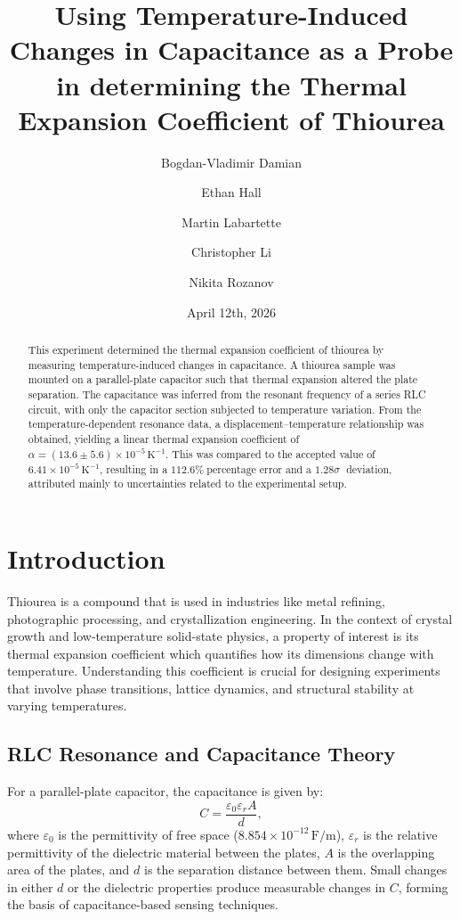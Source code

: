 \documentclass[letterpaper,12pt]{article}
\title{Using Temperature-Induced Changes in Capacitance as a Probe in determining the Thermal Expansion Coefficient of Thiourea }
\author[1]{Bogdan-Vladimir Damian}
\author[1]{Ethan Hall}
\author[1]{Martin Labartette}
\author[1]{Christopher Li}
\author[1]{Nikita Rozanov}
\affil[1]{McGill University, Department of Physics, 3600 University Street, H3A 2T8 Montréal Québec, Canada}
\date{April 12th, 2026}                     %
\begin{document}
\maketitle %


\begin{abstract}

\noindent
This experiment determined the thermal expansion coefficient of thiourea by measuring temperature-induced changes in capacitance. A thiourea sample was mounted on a parallel-plate capacitor such that thermal expansion altered the plate separation. The capacitance was inferred from the resonant frequency of a series RLC circuit, with only the capacitor section subjected to temperature variation. From the temperature-dependent resonance data, a displacement–temperature relationship was obtained, yielding a linear thermal expansion coefficient of \(\alpha = (13.6 \pm 5.6) \times 10^{-5}\,\mathrm{K^{-1}}\). This was compared to the accepted value of \(6.41 \times 10^{-5}\,\mathrm{K^{-1}}\), resulting in a \(112.6\% \;\text{percentage error and a } 1.28\sigma \;\) deviation, attributed mainly to uncertainties related to the experimental setup.

\end{abstract}




\section{Introduction}
Thiourea is a compound that is used in industries like metal refining, photographic processing, and crystallization engineering. In the context of crystal growth and low-temperature solid-state physics, a property of interest is its thermal expansion coefficient which quantifies how its dimensions change with temperature. Understanding this coefficient is crucial for designing experiments that involve phase transitions, lattice dynamics, and structural stability at varying temperatures. 

\subsection{RLC Resonance and Capacitance Theory}  

For a parallel-plate capacitor, the capacitance is given by:  
\begin{equation}
    C = \frac{\varepsilon_0 \varepsilon_r A}{d},
    \label{eq1}
\end{equation}  
where \(\varepsilon_0\) is the permittivity of free space (\(8.854 \times 10^{-12}\, \text{F/m}\)), \(\varepsilon_r\) is the relative permittivity of the dielectric material between the plates, \(A\) is the overlapping area of the plates, and \(d\) is the separation distance between them. Small changes in either \(d\) or the dielectric properties produce measurable changes in \(C\), forming the basis of capacitance-based sensing techniques.  
\end{document}
